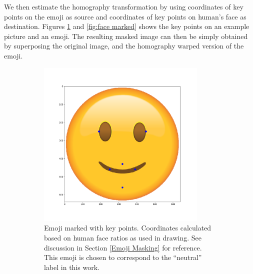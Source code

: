 \documentclass{article}
\begin{document}
We then estimate the homography transformation by using coordinates of key points on the emoji as source and coordinates of key points on human's face as destination. Figures \ref{fig:emoji marked} and \ref{fig:face marked} shows the key points on an example picture and an emoji. The resulting masked image can then be simply obtained by superposing the original image, and the homography warped version of the emoji. 
\begin{figure}
    \centering
    \begin{subfigure}[b]{0.49\textwidth}
        \centering
        \includegraphics[width=0.89\textwidth]{figs/emoji_with_marks.pdf}
        \caption{Emoji marked with key points. Coordinates calculated based on human face ratios as used in drawing. See discussion in Section \ref{Emoji Masking} for reference. This emoji is chosen to correspond to the ``neutral'' label in this work.}
        \label{fig:emoji marked}
    \end{subfigure}
    \hfill%
    \begin{subfigure}[b]{0.48\textwidth}
        \centering

\end{subfigure}
\end{figure}
\end{document}
